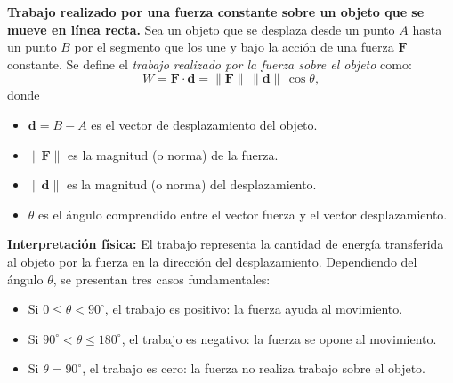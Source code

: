 \begin{definition}\label{def:trabajo_fuer_constante}\textbf{Trabajo realizado por una fuerza constante sobre un objeto que se mueve en l\'inea recta.}  
Sea un objeto que se desplaza desde un punto $A$ hasta un punto $B$ por el segmento que los une y  bajo la acci\'on de una fuerza \(\mathbf{F}\) constante. 
Se define el     \emph{trabajo realizado por la fuerza sobre el objeto} como:
\[
W = \mathbf{F} \cdot \mathbf{d} = \|\mathbf{F}\| \, \|\mathbf{d}\| \, \cos\theta,
\]
donde
\begin{itemize} 
\item $\mathbf{d} = B - A$ es el vector de desplazamiento del objeto. 
\item $\|\mathbf{F}\|$ es la magnitud (o norma) de la fuerza.
\item $\|\mathbf{d}\|$ es la magnitud (o norma) del desplazamiento.
\item $\theta$ es el ángulo comprendido entre el vector fuerza y el vector desplazamiento. 
\end{itemize} 
\end{definition}



\textbf{Interpretaci\'on física:} El trabajo representa la cantidad de energ\'ia transferida al objeto por la fuerza en la direcci\'on del desplazamiento. Dependiendo del ángulo $\theta$, se presentan tres casos fundamentales:
\begin{itemize}
    \item Si \(0 \leq \theta < 90^\circ\), el trabajo es positivo: la fuerza ayuda al movimiento.
    \item Si \(90^\circ < \theta \leq 180^\circ\), el trabajo es negativo: la fuerza se opone al movimiento.
    \item Si \(\theta = 90^\circ\), el trabajo es cero: la fuerza no realiza trabajo sobre el objeto.
\end{itemize}


\begin{figure}[htbp]
    \centering
     
    \label{fig:interpretacion fisica}
\end{figure}


